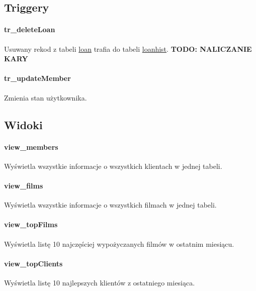 \documentclass[12pt,a4paper,titlepage]{article}
\begin{document}

\subsection{Triggery}
\paragraph{tr\_deleteLoan}
Usuwany rekod z tabeli \underline{loan} trafia do tabeli \underline{loanhist}.
\textbf{TODO: NALICZANIE KARY}

\paragraph{tr\_updateMember}
Zmienia stan użytkownika.




\subsection{Widoki}

\paragraph{view\_members}
Wyświetla wszystkie informacje o wszystkich klientach w jednej tabeli.

\paragraph{view\_films}
Wyświetla wszystkie informacje o wszystkich filmach w jednej tabeli.

\paragraph{view\_topFilms}
Wyświetla listę 10 najczęściej wypożyczanych filmów w ostatnim miesiącu.

\paragraph{view\_topClients}
Wyświetla listę 10 najlepszych klientów z ostatniego miesiąca.
\end{document}
